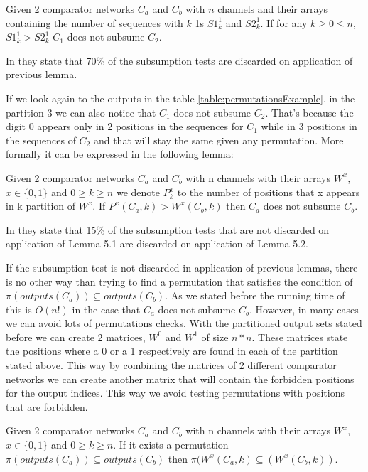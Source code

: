 \documentclass[../main.tex]{subfiles}
\begin{document}
	\begin{lemma}
		Given 2 comparator networks $C_a$ and $C_b$ with $n$ channels and their arrays containing the number of sequences with $k$ 1s $S1^{1}_k$ and $S2^{1}_k$. If for any $k\geq 0 \leq n$, $S1^{1}_k > S2^{1}_k$ $C_1$ does not subsume $C_2$.
	\end{lemma}
	
	In \cite{sortingnineinputs} they state that 70\% of the subsumption tests are discarded on application of previous lemma.
	
	If we look again to the outputs in the table \ref{table:permutationsExample}, in the partition 3 we can also notice that $C_1$ does not subsume $C_2$. That's because the digit 0 appears only in 2 positions in the sequences for $C_1$ while in 3 positions in the sequences of $C_2$ and that will stay the same given any permutation. More formally it can be expressed in the following lemma:
	
	\begin{lemma}
		Given 2 comparator networks $C_a$ and $C_b$ with n channels with their arrays $W^x$, $x \in \{0,1\}$ and $0\geq k \geq n$ we denote $P{^x_k}$ to the number of positions that x appears in k partition of $W^x$. If $P^x(C_a, k) > W^x(C_b, k)$ then $C_a$ does not subsume $C_b$.
	\end{lemma}
	
	In \cite{sortingnineinputs} they state that 15\% of the subsumption tests that are not discarded on application of Lemma 5.1 are discarded on application of Lemma 5.2.
	
	If the subsumption test is not discarded in application of previous lemmas, there is no other way than trying to find a permutation that satisfies the condition of $\pi(outputs(C_a)) \subseteq outputs(C_b)$. As we stated before the running time of this is $O(n!)$ in the case that $C_a$ does not subsume $C_b$. However, in many cases we can avoid lots of permutations checks. With the partitioned output sets stated before we can create 2 matrices, $W^0$ and $W^1$ of size $n*n$. These matrices state the positions where a 0 or a 1 respectively are found in each of the partition stated above. This way by combining the matrices of 2 different comparator networks we can create another matrix that will contain the forbidden positions for the output indices. This way we avoid testing permutations with positions that are forbidden.
	
	\begin{lemma}
		Given 2 comparator networks $C_a$ and $C_b$ with n channels with their arrays $W^x$, $x \in \{0,1\}$ and $0\geq k \geq n$. If it exists a permutation $\pi(outputs(C_a)) \subseteq outputs(C_b)$ then $\pi(W^x(C_a, k) \subseteq (W^x(C_b, k))$.
	\end{lemma}
	
\end{document}

